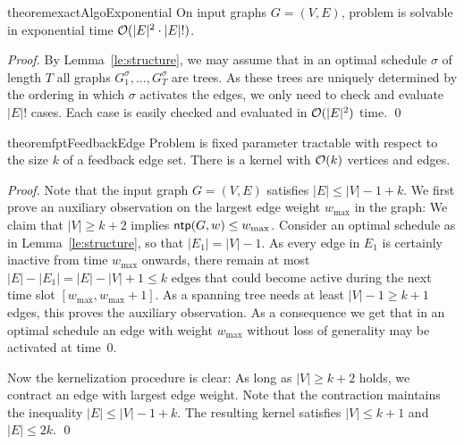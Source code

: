 \begin{restatable}{theorem}{exactAlgoExponential}
\label{th:exact}
On input graphs $G=(V,E)$, problem {\xxxNTP} is solvable in exponential time $\mathcal{O}(|E|^2\cdot|E|!)$. 
\end{restatable}
\begin{proof}
By Lemma~\ref{le:structure}, we may assume that in an optimal schedule $\sigma$ of length $T$ 
all graphs $G_1^\sigma, \dots, G_T^\sigma$ are trees.
As these trees are uniquely determined by the ordering in which $\sigma$ activates the edges,
we only need to check and evaluate $|E|!$ cases.
Each case is easily checked and evaluated in $\mathcal{O}(|E|^2)$ time.
\qed
\end{proof}

\begin{restatable}{theorem}{fptFeedbackEdge}
\label{thm:FPT_feedback_edge_set}
Problem {\xxxNTP} is fixed parameter tractable with respect to the size $k$ of a feedback edge set. 
There is a kernel with $\mathcal{O}(k)$ vertices and edges. 
\end{restatable}
\begin{proof}
Note that the input graph $G=(V,E)$ satisfies $|E|\le|V|-1+k$.
We first prove an auxiliary observation on the largest edge weight $w_{\max}$ in the graph:
We claim that $|V|\ge k+2$ implies $\operatorname{\textsf{ntp}}(G,w)\le w_{\max}$. 
Consider an optimal schedule as in Lemma~\ref{le:structure}, so that $|E_1|=|V|-1$.
As every edge in $E_1$ is certainly inactive from time $w_{\max}$ onwards, there remain at most 
$|E|-|E_1|=|E|-|V|+1\le k$ edges that could become active during the next time slot $[w_{\max},w_{\max}+1]$.
As a spanning tree needs at least $|V|-1\ge k+1$ edges, this proves the auxiliary observation.
As a consequence we get that in an optimal schedule an edge with weight $w_{\max}$ without loss 
of generality may be activated at time~$0$.

Now the kernelization procedure is clear:
As long as $|V|\ge k+2$ holds, we contract an edge with largest edge weight.
Note that the contraction maintains the inequality $|E|\le|V|-1+k$.
The resulting kernel satisfies $|V|\le k+1$ and $|E|\le2k$.
\qed
\end{proof}


